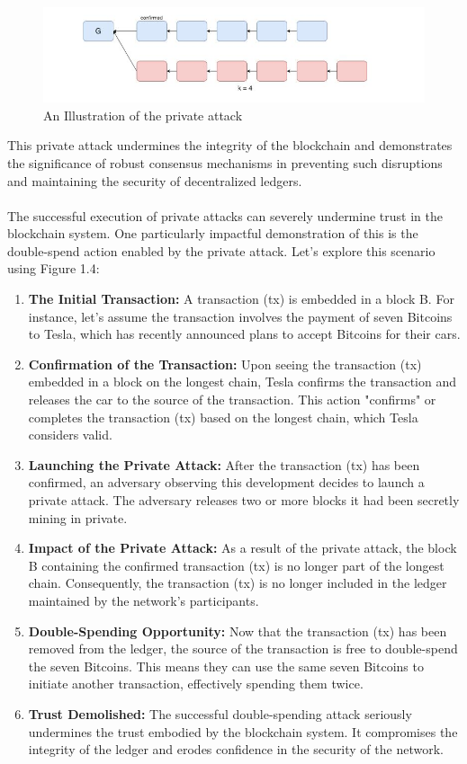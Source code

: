\begin{center}
	\begin{figure}[h!]
		\centering
		\includegraphics[width=0.6\linewidth]{Fig/03/F3}
		\caption{An Illustration of the private attack}
		\label{fig:l3_f3}
	\end{figure}
\end{center}
This private attack undermines the integrity of the blockchain and demonstrates the significance of robust consensus mechanisms in preventing such disruptions and maintaining the security of decentralized ledgers.\\\\
The successful execution of private attacks can severely undermine trust in the blockchain system. One particularly impactful demonstration of this is the double-spend action enabled by the private attack. Let's explore this scenario using Figure 1.4:
\begin{enumerate}
	\item \textbf{The Initial Transaction:} A transaction (tx) is embedded in a block B. For instance, let's assume the transaction involves the payment of seven Bitcoins to Tesla, which has recently announced plans to accept Bitcoins for their cars.
	\item \textbf{Confirmation of the Transaction:} Upon seeing the transaction (tx) embedded in a block on the longest chain, Tesla confirms the transaction and releases the car to the source of the transaction. This action "confirms" or completes the transaction (tx) based on the longest chain, which Tesla considers valid.
	\item \textbf{Launching the Private Attack:} After the transaction (tx) has been confirmed, an adversary observing this development decides to launch a private attack. The adversary releases two or more blocks it had been secretly mining in private.
	\item \textbf{Impact of the Private Attack:} As a result of the private attack, the block B containing the confirmed transaction (tx) is no longer part of the longest chain. Consequently, the transaction (tx) is no longer included in the ledger maintained by the network's participants.
	\item \textbf{Double-Spending Opportunity:} Now that the transaction (tx) has been removed from the ledger, the source of the transaction is free to double-spend the seven Bitcoins. This means they can use the same seven Bitcoins to initiate another transaction, effectively spending them twice.
	\item \textbf{Trust Demolished:} The successful double-spending attack seriously undermines the trust embodied by the blockchain system. It compromises the integrity of the ledger and erodes confidence in the security of the network.
\end{enumerate}
